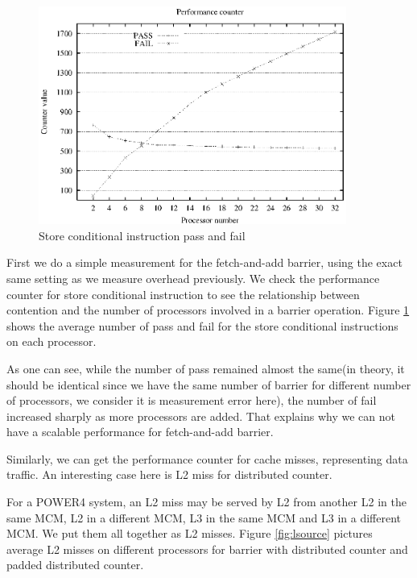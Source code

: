 \begin{figure}[!h]
  \begin{center}
    \includegraphics[angle=0, width=0.9\textwidth]{stcx.eps}
    \caption{Store conditional instruction pass and fail}
    \label{fig:stcx}
    \end{center}
\end{figure}

First we do a simple measurement for the fetch-and-add barrier, using
the exact same setting as we measure overhead previously. We check the
performance counter for store conditional instruction to see the
relationship between contention and the number of processors involved
in a barrier operation. Figure \ref{fig:stcx} shows the average number
of pass and fail for the store conditional instructions on each
processor.

As one can see, while the number of pass remained almost the same(in
theory, it should be identical since we have the same number of
barrier for different number of processors, we consider it is
measurement error here), the number of fail increased sharply as more
processors are added.  That explains why we can not have a scalable
performance for fetch-and-add barrier.


Similarly, we can get the performance counter for cache misses,
representing data traffic. An interesting case here is L2 miss for
distributed counter.

For a POWER4 system, an L2 miss may be served by L2 from another L2 in
the same MCM, L2 in a different MCM, L3 in the same MCM and L3 in a
different MCM. We put them all together as L2 misses. Figure
\ref{fig:lsource} pictures average L2 misses on different processors
for barrier with distributed counter and padded distributed counter.

